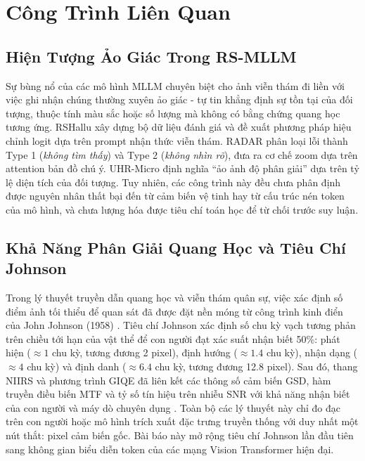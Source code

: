\section{Công Trình Liên Quan}
\label{sec:related}

\subsection{Hiện Tượng Ảo Giác Trong RS-MLLM}
Sự bùng nổ của các mô hình MLLM chuyên biệt cho ảnh viễn thám \cite{geochat2024, llavanext2024} đi liền với việc ghi nhận chúng thường xuyên ảo giác - tự tin khẳng định sự tồn tại của đối tượng, thuộc tính màu sắc hoặc số lượng mà không có bằng chứng quang học tương ứng. RSHallu \cite{rshallu2024} xây dựng bộ dữ liệu đánh giá và đề xuất phương pháp hiệu chỉnh logit dựa trên prompt nhận thức viễn thám. RADAR \cite{radar2024} phân loại lỗi thành Type 1 (\textit{không tìm thấy}) và Type 2 (\textit{không nhìn rõ}), đưa ra cơ chế zoom dựa trên attention bản đồ chú ý. UHR-Micro \cite{uhrmicro2024} định nghĩa ``ảo ảnh độ phân giải'' dựa trên tỷ lệ diện tích của đối tượng. Tuy nhiên, các công trình này đều chưa phân định được nguyên nhân thất bại đến từ cảm biến vệ tinh hay từ cấu trúc nén token của mô hình, và chưa lượng hóa được tiêu chí toán học để từ chối trước suy luận.

\subsection{Khả Năng Phân Giải Quang Học và Tiêu Chí Johnson}
Trong lý thuyết truyền dẫn quang học và viễn thám quân sự, việc xác định số điểm ảnh tối thiểu để quan sát đã được đặt nền móng từ công trình kinh điển của John Johnson (1958) \cite{johnson1958analysis}. Tiêu chí Johnson xác định số chu kỳ vạch tương phản trên chiều tới hạn của vật thể để con người đạt xác suất nhận biết 50\%: phát hiện ($\approx 1$ chu kỳ, tương đương 2 pixel), định hướng ($\approx 1.4$ chu kỳ), nhận dạng ($\approx 4$ chu kỳ) và định danh ($\approx 6.4$ chu kỳ, tương đương 12.8 pixel). Sau đó, thang NIIRS và phương trình GIQE \cite{leachtenauer1997general} đã liên kết các thông số cảm biến GSD, hàm truyền điều biến MTF và tỷ số tín hiệu trên nhiễu SNR với khả năng nhận biết của con người và máy dò chuyên dụng \cite{driggersinfrared}. Toàn bộ các lý thuyết này chỉ đo đạc trên con người hoặc mô hình trích xuất đặc trưng truyền thống với duy nhất một nút thắt: pixel cảm biến gốc. Bài báo này mở rộng tiêu chí Johnson lần đầu tiên sang không gian biểu diễn token của các mạng Vision Transformer hiện đại.

